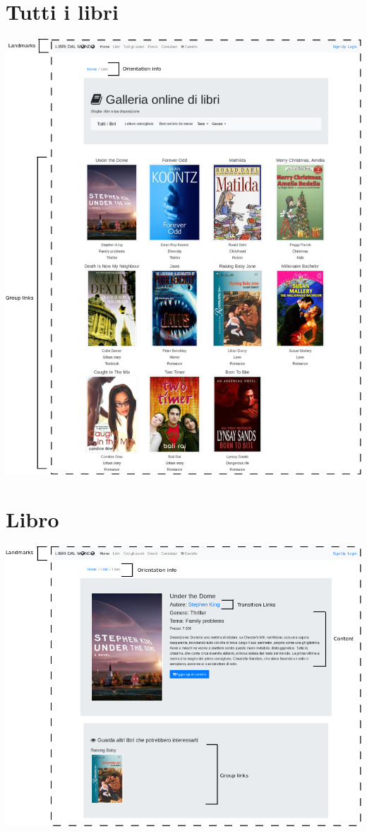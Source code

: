 \documentclass[12pt,a4paper,oneside]{report}
\begin{document}
\section{Tutti i libri}

\includegraphics[width=1\textwidth]{tutti_libri}

\section{Libro}

\includegraphics[width=1\textwidth]{libro}
\end{document}
